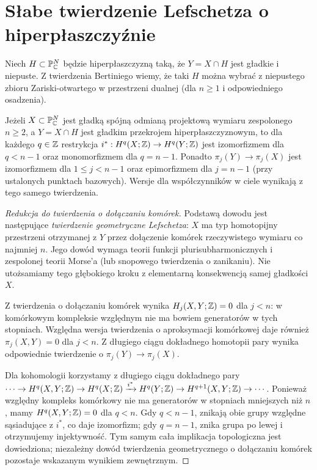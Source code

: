 \section{Słabe twierdzenie Lefschetza o hiperpłaszczyźnie}
Niech $H\subset\mathbb P^N_{\mathbb{C}}$ będzie hiperpłaszczyzną taką,
że $Y=X\cap H$ jest gładkie i niepuste. Z twierdzenia Bertiniego
wiemy, że taki $H$ można wybrać z niepustego zbioru Zariski-otwartego
w przestrzeni dualnej (dla $n\ge1$ i odpowiedniego osadzenia).

\begin{twierdzenie}
\label{thm:xvii-weak-lefschetz}
Jeżeli $X\subset\mathbb P^N_{\mathbb{C}}$ jest gładką spójną odmianą
projektową wymiaru zespolonego $n\ge2$, a $Y=X\cap H$ jest gładkim
przekrojem hiperpłaszczyznowym, to dla każdego $q\in\mathbb{Z}$
restrykcja
$i^*:H^q(X;\mathbb{Z})\to H^q(Y;\mathbb{Z})$ jest izomorfizmem dla
$q<n-1$ oraz monomorfizmem dla $q=n-1$.
Ponadto $\pi_j(Y)\to\pi_j(X)$ jest izomorfizmem dla
$1\le j<n-1$ oraz epimorfizmem dla $j=n-1$ (przy ustalonych
punktach bazowych). Wersje dla współczynników w ciele
wynikają z tego samego twierdzenia.
\end{twierdzenie}
\begin{proof}[Redukcja do twierdzenia o dołączaniu komórek]
Podstawą dowodu jest następujące \emph{twierdzenie geometryczne
Lefschetza}: $X$ ma typ homotopijny przestrzeni otrzymanej z $Y$
przez dołączenie komórek rzeczywistego wymiaru co najmniej $n$.
Jego dowód wymaga teorii funkcji plurisubharmonicznych i
zespolonej teorii Morse'a (lub snopowego twierdzenia o zanikaniu).
Nie utożsamiamy tego głębokiego kroku z elementarną konsekwencją
samej gładkości $X$.

Z twierdzenia o dołączaniu komórek wynika
$H_j(X,Y;\mathbb{Z})=0$ dla $j<n$: w komórkowym kompleksie
względnym nie ma bowiem generatorów w tych stopniach.
Względna wersja twierdzenia o aproksymacji komórkowej daje
również $\pi_j(X,Y)=0$ dla $j<n$.
Z długiego ciągu dokładnego homotopii pary wynika odpowiednie
twierdzenie o $\pi_j(Y)\to\pi_j(X)$.

Dla kohomologii korzystamy z długiego ciągu dokładnego pary
$\cdots\to H^q(X,Y;\mathbb{Z})\to H^q(X;\mathbb{Z})
\xrightarrow{i^*}H^q(Y;\mathbb{Z})\to H^{q+1}(X,Y;\mathbb{Z})\to\cdots$.
Ponieważ względny kompleks komórkowy nie ma generatorów
w stopniach mniejszych niż $n$, mamy
$H^q(X,Y;\mathbb{Z})=0$ dla $q<n$. Gdy $q<n-1$, znikają
obie grupy względne sąsiadujące z $i^*$, co daje izomorfizm;
gdy $q=n-1$, znika grupa po lewej i otrzymujemy injektywność.
Tym samym cała implikacja topologiczna jest dowiedziona;
niezależny dowód twierdzenia geometrycznego o dołączaniu
komórek pozostaje wskazanym wynikiem zewnętrznym.
\end{proof}

